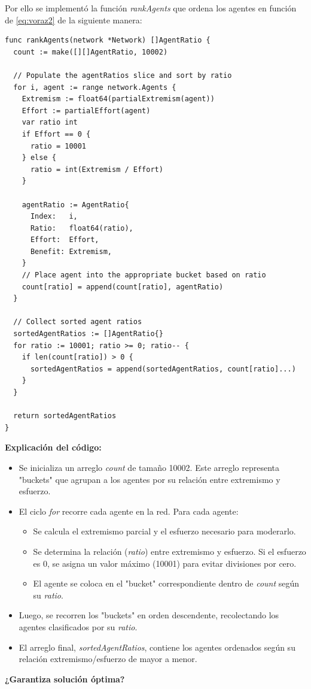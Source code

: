 \documentclass[letterpaper,10pt]{article}
\begin{document}
Por ello se implementó la función \textit{rankAgents} que ordena los agentes en función de \eqref{eq:voraz2} de la siguiente manera:
\begin{lstlisting}[caption={Rank Agents}, label={lst:rank_agents}]
func rankAgents(network *Network) []AgentRatio {
  count := make([][]AgentRatio, 10002)

  // Populate the agentRatios slice and sort by ratio
  for i, agent := range network.Agents {
    Extremism := float64(partialExtremism(agent))
    Effort := partialEffort(agent)
    var ratio int
    if Effort == 0 {
      ratio = 10001
    } else {
      ratio = int(Extremism / Effort)
    }

    agentRatio := AgentRatio{
      Index:   i,
      Ratio:   float64(ratio),
      Effort:  Effort,
      Benefit: Extremism,
    }
    // Place agent into the appropriate bucket based on ratio
    count[ratio] = append(count[ratio], agentRatio)
  }

  // Collect sorted agent ratios
  sortedAgentRatios := []AgentRatio{}
  for ratio := 10001; ratio >= 0; ratio-- {
    if len(count[ratio]) > 0 {
      sortedAgentRatios = append(sortedAgentRatios, count[ratio]...)
    }
  }

  return sortedAgentRatios
}
\end{lstlisting}
\textbf{Explicación del código:}
\begin{itemize}
  \item Se inicializa un arreglo \textit{count} de tamaño 10002. Este arreglo representa "buckets" que agrupan a los agentes por su relación entre extremismo y esfuerzo.
  \item El ciclo \textit{for} recorre cada agente en la red. Para cada agente:
  \begin{itemize}
    \item Se calcula el extremismo parcial y el esfuerzo necesario para moderarlo.
    \item Se determina la relación (\textit{ratio}) entre extremismo y esfuerzo. Si el esfuerzo es 0, se asigna un valor máximo (10001) para evitar divisiones por cero.
    \item El agente se coloca en el "bucket" correspondiente dentro de \textit{count} según su \textit{ratio}.
  \end{itemize}
  \item Luego, se recorren los "buckets" en orden descendente, recolectando los agentes clasificados por su \textit{ratio}.
  \item El arreglo final, \textit{sortedAgentRatios}, contiene los agentes ordenados según su relación extremismo/esfuerzo de mayor a menor.
\end{itemize}
\textbf{¿Garantiza solución óptima?}
\end{document}
